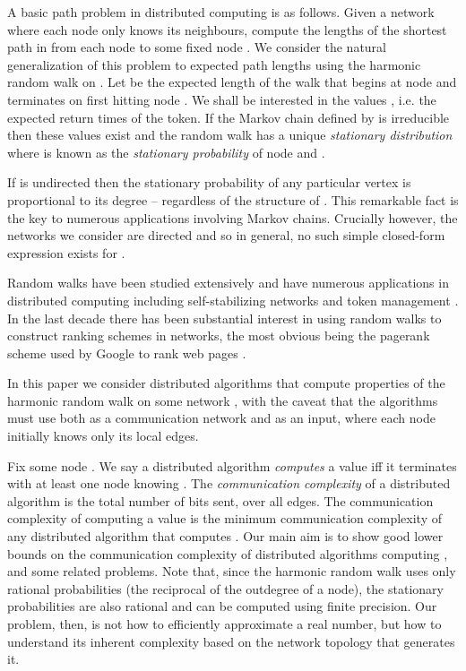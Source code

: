 \documentclass[twocolumn]{article}
\begin{document}
A basic path problem in distributed computing is as follows. Given a network  where each node only knows its neighbours, compute the lengths  of the shortest path in  from each node  to some fixed node . We consider the natural generalization of this problem to expected path lengths using the harmonic random walk on . Let  be the expected length of the walk that begins at node  and terminates on first hitting node . We shall be interested in the values , i.e. the expected return times of the token. If the Markov chain defined by  is irreducible then these values exist and the random walk has a unique {\em stationary distribution}  where  is known as the {\em stationary probability} of node  and .

If  is undirected then the stationary probability of any particular vertex is proportional to its degree -- regardless of the structure of . This remarkable fact is the key to numerous applications involving Markov chains. Crucially however, the networks we consider are directed and so in general, no such simple closed-form expression exists for .

Random walks have been studied extensively and have numerous applications in distributed computing including self-stabilizing networks and token management \cite{coppersmith93}. In the last decade there has been substantial interest in using random walks to construct ranking schemes in networks, the most obvious being the pagerank scheme used by Google to rank web pages \cite{page98pagerank}.

In this paper we consider distributed algorithms that compute properties of the harmonic random walk on some network , with the caveat that the algorithms must use  both as a communication network and as an input, where each node initially knows only its local edges.

Fix some node . We say a distributed algorithm {\em computes} a value  iff it
terminates with at least one node knowing . The {\em communication
complexity} of a distributed algorithm is the total number of bits sent,
over all edges. The communication complexity of computing a value  is
the minimum communication complexity of any distributed algorithm that
computes . Our main aim is to show good lower bounds on the communication complexity of distributed algorithms computing , and some related problems.
Note that, since the harmonic random walk uses only rational probabilities (the reciprocal of the outdegree of a node), the stationary probabilities are also rational and can be computed using finite precision. Our problem, then, is not how to efficiently approximate a real number, but how to understand its inherent complexity based on the network topology that generates it.
\end{document}
